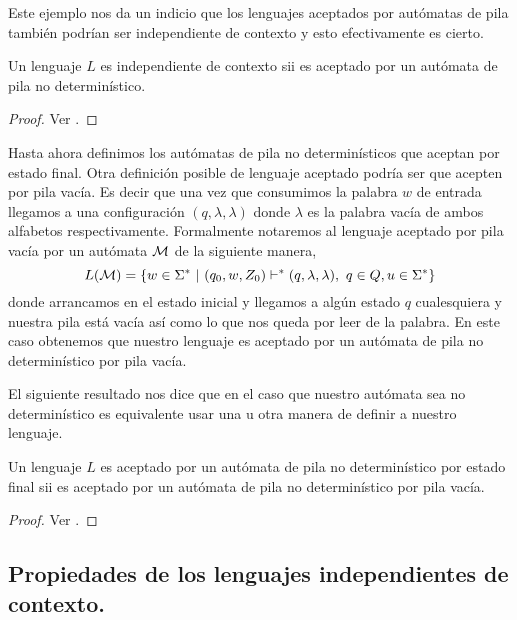 \documentclass[tesis.tex]{subfiles}
\newcommand{\ic}{independiente de contexto }
\begin{document}
Este ejemplo nos da un indicio que los lenguajes aceptados por autómatas de pila también podrían ser \ic y esto efectivamente es cierto.

\medskip

\begin{teo}\label{teo_ic_apnd}
Un lenguaje $L$ es independiente de contexto sii es aceptado por un autómata de pila no determinístico.
\end{teo}

\begin{proof}
	Ver \cite{hopcraft-ullman}.
\end{proof}
 


Hasta ahora definimos los autómatas de pila no determinísticos que aceptan por estado final. Otra definición posible de lenguaje aceptado podría ser que acepten por pila vacía. 
Es decir que una vez que consumimos la palabra $w$ de entrada llegamos a una configuración $(q, \lambda, \lambda)$ donde $\lambda$ es la palabra vacía de ambos alfabetos respectivamente. Formalmente notaremos al lenguaje aceptado por pila vacía por un autómata $\cal M$
de la siguiente manera,
\begin{equation*}
	L({\cal M}) = \{ w \in \Sigma^* \ | \ (q_0,w,Z_0) \vdash^* (q, \lambda, \lambda), \ q \in Q, u \in \Sigma^*    \}
\end{equation*}
donde arrancamos en el estado inicial y llegamos a algún estado $q$ cualesquiera y nuestra pila está vacía así como lo que nos queda por leer de la palabra. 
En este caso obtenemos que nuestro lenguaje es aceptado por un autómata de pila no determinístico por pila vacía.


El siguiente resultado nos dice que en el caso que nuestro autómata sea no determinístico es equivalente usar una u otra manera de definir a nuestro lenguaje.

\medskip
\begin{teo}
Un lenguaje $L$ es aceptado por un autómata de pila no determinístico por estado final sii es aceptado por un autómata de pila no determinístico por pila vacía.
\end{teo}

\begin{proof}
	Ver \cite{hopcraft-ullman}.
\end{proof}


\subsection{Propiedades de los lenguajes independientes de contexto.}
\end{document}
